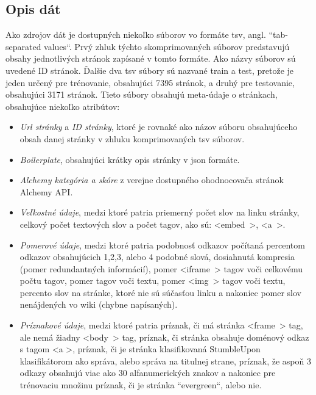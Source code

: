 \documentclass{iitsrc}
\begin{document}
\begin{multicols}{2}
\section{Opis dát}
Ako zdrojov dát je dostupných niekoľko súborov vo formáte tsv, angl. ``tab-separated values``. Prvý zhluk týchto skomprimovaných súborov predstavujú obsahy jednotlivých stránok zapísané v tomto formáte. Ako názvy súborov sú uvedené ID stránok.
%
Ďalšie dva tsv súbory sú nazvané train a test, pretože je jeden určený pre trénovanie, obsahujúci 7395 stránok, a druhý pre testovanie, obsahujúci 3171 stránok. Tieto súbory obsahujú meta-údaje o stránkach, obsahujúce niekoľko atribútov:
%
\begin{itemize}
	\item \emph{Url stránky} a \emph{ID stránky}, ktoré je rovnaké ako názov súboru obsahujúceho obsah danej stránky v zhluku komprimovaných tsv súborov.
%
	\item \emph{Boilerplate}, obsahujúci krátky opis stránky v json formáte.
%
	\item \emph{Alchemy kategória a skóre} z verejne dostupného ohodnocovača stránok Alchemy API.
%
	\item \emph{Veľkostné údaje}, medzi ktoré patria priemerný počet slov na linku stránky, celkový počet textových slov a počet tagov, ako sú: \mbox{\textless embed \textgreater}, \mbox{\textless a \textgreater}.
%
	\item \emph{Pomerové údaje}, medzi ktoré patria podobnosť odkazov počítaná percentom odkazov obsahujúcich 1,2,3, alebo 4 podobné slová, dosiahnutá kompresia (pomer redundantných informácií), pomer \mbox{\textless iframe \textgreater} tagov voči celkovému počtu tagov, pomer tagov voči textu, pomer \mbox{\textless img \textgreater} tagov voči textu, percento slov na stránke, ktoré nie sú súčasťou linku a nakoniec pomer slov nenájdených vo wiki (chybne napísaných).
%
	\item \emph{Príznakové údaje}, medzi ktoré patria príznak, či má stránka \mbox{\textless frame \textgreater} tag, ale nemá žiadny \mbox{\textless body \textgreater} tag, príznak, či stránka obsahuje doménový odkaz s tagom \textless a \textgreater, príznak, či je stránka klasifikovaná StumbleUpon klasifikátorom ako správa, alebo správa na titulnej strane, príznak, že aspoň 3 odkazy obsahujú viac ako 30 alfanumerických znakov a nakoniec pre trénovaciu množinu príznak, či je stránka ``evergreen``, alebo nie.
\end{itemize}


\end{multicols}
\end{document}
